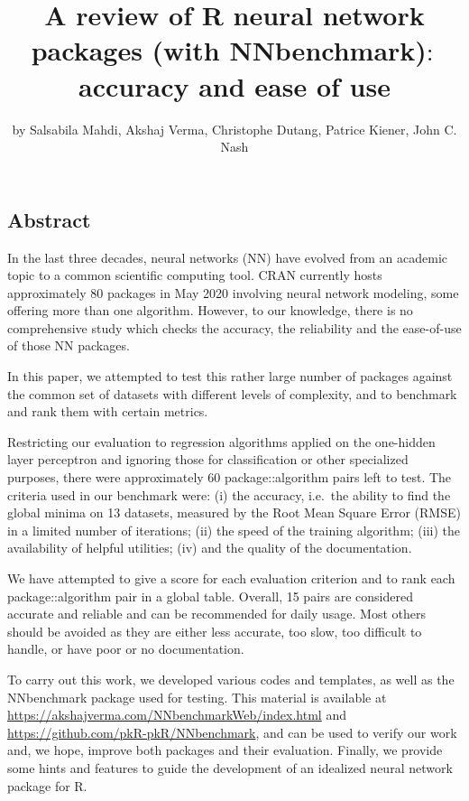 \title{A review of R neural network packages (with NNbenchmark)\(:\) accuracy
and ease of use}
\author{by Salsabila Mahdi, Akshaj Verma, Christophe Dutang, Patrice Kiener, John C. Nash}

\maketitle


\hypertarget{abstract}{%
\subsection{Abstract}\label{abstract}}

In the last three decades, neural networks (NN) have evolved from an
academic topic to a common scientific computing tool. CRAN currently
hosts approximately 80 packages in May 2020 involving neural network
modeling, some offering more than one algorithm. However, to our
knowledge, there is no comprehensive study which checks the accuracy,
the reliability and the ease-of-use of those NN packages.

In this paper, we attempted to test this rather large number of packages
against the common set of datasets with different levels of complexity,
and to benchmark and rank them with certain metrics.

Restricting our evaluation to regression algorithms applied on the
one-hidden layer perceptron and ignoring those for classification or
other specialized purposes, there were approximately 60
package::algorithm pairs left to test. The criteria used in our
benchmark were: (i) the accuracy, i.e.~the ability to find the global
minima on 13 datasets, measured by the Root Mean Square Error (RMSE) in
a limited number of iterations; (ii) the speed of the training
algorithm; (iii) the availability of helpful utilities; (iv) and the
quality of the documentation.

We have attempted to give a score for each evaluation criterion and to
rank each package::algorithm pair in a global table. Overall, 15 pairs
are considered accurate and reliable and can be recommended for daily
usage. Most others should be avoided as they are either less accurate,
too slow, too difficult to handle, or have poor or no documentation.

To carry out this work, we developed various codes and templates, as
well as the NNbenchmark package used for testing. This material is
available at \url{https://akshajverma.com/NNbenchmarkWeb/index.html} and
\url{https://github.com/pkR-pkR/NNbenchmark}, and can be used to verify
our work and, we hope, improve both packages and their evaluation.
Finally, we provide some hints and features to guide the development of
an idealized neural network package for R.

